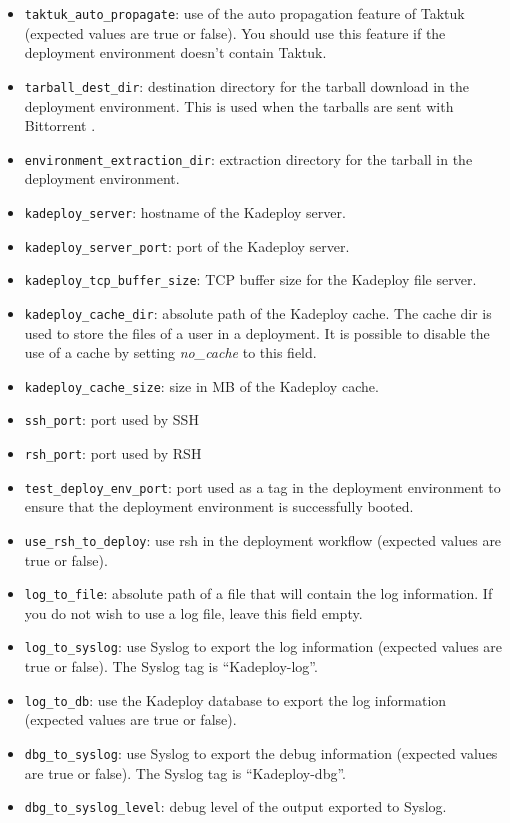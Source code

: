 \documentclass[a4wide,10pt,oneside]{book}
\begin{document}
\begin{itemize}
\item \texttt{taktuk\_auto\_propagate}: use of the auto propagation feature of Taktuk (expected values are true or false). You should use this feature if the deployment environment doesn't contain Taktuk.
\item \texttt{tarball\_dest\_dir}: destination directory for the tarball download in the deployment environment. This is used when the tarballs are sent with Bittorrent .
\item \texttt{environment\_extraction\_dir}: extraction directory for the tarball in the deployment environment.
\item \texttt{kadeploy\_server}: hostname of the Kadeploy server.
\item \texttt{kadeploy\_server\_port}: port of the Kadeploy server.
\item \texttt{kadeploy\_tcp\_buffer\_size}: TCP buffer size for the Kadeploy file server.
\item \texttt{kadeploy\_cache\_dir}: absolute path of the Kadeploy cache. The cache dir is used to store the files of a user in a deployment. It is possible to disable the use of a cache by setting \textit{no\_cache} to this field.
\item \texttt{kadeploy\_cache\_size}: size in MB of the Kadeploy cache.
\item \texttt{ssh\_port}: port used by SSH
\item \texttt{rsh\_port}: port used by RSH
\item \texttt{test\_deploy\_env\_port}: port used as a tag in the deployment environment to ensure that the deployment environment is successfully booted.
\item \texttt{use\_rsh\_to\_deploy}: use rsh in the deployment workflow (expected values are true or false).
\item \texttt{log\_to\_file}: absolute path of a file that will contain the log information. If you do not wish to use a log file, leave this field empty.
\item \texttt{log\_to\_syslog}: use Syslog to export the log information (expected values are true or false). The Syslog tag is ``Kadeploy-log''.
\item \texttt{log\_to\_db}: use the Kadeploy database to export the log information (expected values are true or false).
\item \texttt{dbg\_to\_syslog}: use Syslog to export the debug information (expected values are true or false). The Syslog tag is ``Kadeploy-dbg''.
\item \texttt{dbg\_to\_syslog\_level}: debug level of the output exported to Syslog.

\end{itemize}
\end{document}
